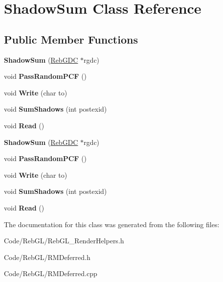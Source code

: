 \hypertarget{class_shadow_sum}{}\section{Shadow\+Sum Class Reference}
\label{class_shadow_sum}
\subsection*{Public Member Functions}
\begin{DoxyCompactItemize}
\item 
{\bfseries Shadow\+Sum} (\hyperlink{class_reb_g_d_c}{Reb\+G\+DC} $\ast$rgdc)\hypertarget{class_shadow_sum_a0528a4b63747539cf3e83f567c78a658}{}\label{class_shadow_sum_a0528a4b63747539cf3e83f567c78a658}

\item 
void {\bfseries Pass\+Random\+P\+CF} ()\hypertarget{class_shadow_sum_a34d1045948782836aa3bd223857a6f79}{}\label{class_shadow_sum_a34d1045948782836aa3bd223857a6f79}

\item 
void {\bfseries Write} (char to)\hypertarget{class_shadow_sum_aadf2e3c555bc4fbca923c3c83bf52f84}{}\label{class_shadow_sum_aadf2e3c555bc4fbca923c3c83bf52f84}

\item 
void {\bfseries Sum\+Shadows} (int postexid)\hypertarget{class_shadow_sum_a71d48fe18bd3a5d87030f30243e67dce}{}\label{class_shadow_sum_a71d48fe18bd3a5d87030f30243e67dce}

\item 
void {\bfseries Read} ()\hypertarget{class_shadow_sum_aa74015094c727869c937f666b048c6db}{}\label{class_shadow_sum_aa74015094c727869c937f666b048c6db}

\item 
{\bfseries Shadow\+Sum} (\hyperlink{class_reb_g_d_c}{Reb\+G\+DC} $\ast$rgdc)\hypertarget{class_shadow_sum_a0528a4b63747539cf3e83f567c78a658}{}\label{class_shadow_sum_a0528a4b63747539cf3e83f567c78a658}

\item 
void {\bfseries Pass\+Random\+P\+CF} ()\hypertarget{class_shadow_sum_a34d1045948782836aa3bd223857a6f79}{}\label{class_shadow_sum_a34d1045948782836aa3bd223857a6f79}

\item 
void {\bfseries Write} (char to)\hypertarget{class_shadow_sum_aadf2e3c555bc4fbca923c3c83bf52f84}{}\label{class_shadow_sum_aadf2e3c555bc4fbca923c3c83bf52f84}

\item 
void {\bfseries Sum\+Shadows} (int postexid)\hypertarget{class_shadow_sum_a71d48fe18bd3a5d87030f30243e67dce}{}\label{class_shadow_sum_a71d48fe18bd3a5d87030f30243e67dce}

\item 
void {\bfseries Read} ()\hypertarget{class_shadow_sum_aa74015094c727869c937f666b048c6db}{}\label{class_shadow_sum_aa74015094c727869c937f666b048c6db}

\end{DoxyCompactItemize}


The documentation for this class was generated from the following files\+:\begin{DoxyCompactItemize}
\item 
Code/\+Reb\+G\+L/Reb\+G\+L\+\_\+\+Render\+Helpers.\+h\item 
Code/\+Reb\+G\+L/R\+M\+Deferred.\+h\item 
Code/\+Reb\+G\+L/R\+M\+Deferred.\+cpp\end{DoxyCompactItemize}
